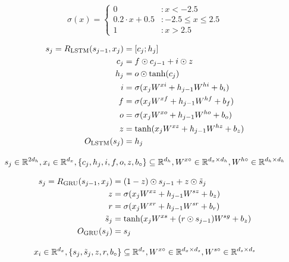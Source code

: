 \begin{equation} \label{eq:hardsigmoid}
  \sigma(x) = \begin{cases}
    0                 & : x < -2.5 \\
    0.2 \cdot x + 0.5 & : -2.5 \leq x \leq 2.5 \\
    1                 & : x > 2.5
  \end{cases}
\end{equation}

\begin{gather} \label{eq:lstm}
  \begin{split}
  s_j = R_{\text{LSTM}}(s_{j-1}, x_j) &= [c_j;h_j] \\
                           c_j &= f \odot c_{j-1} + i \odot z \\
                           h_j &= o \odot \tanh(c_j) \\
                             i &= \sigma(x_j W^{xi} + h_{j-1} W^{hi} + b_i) \\
                             f &= \sigma(x_j W^{xf} + h_{j-1} W^{hf} + b_f) \\
                             o &= \sigma(x_j W^{xo} + h_{j-1} W^{ho} + b_o) \\
                             z &= \tanh(x_j W^{xz} + h_{j-1} W^{hz} + b_z) \\
          O_{\text{LSTM}}(s_j) &= h_j
  \end{split}
  \\[2ex]
  s_j\in \mathbb{R}^{2d_h}, x_i\in \mathbb{R}^{d_x},
  \left\{c_j, h_j, i, f, o, z, b_{\circ}\right\}\subseteq \mathbb{R}^{d_h},
  W^{x\circ}\in \mathbb{R}^{d_x\times d_h},
  W^{h\circ}\in \mathbb{R}^{d_h\times d_h} \notag
\end{gather}

\begin{gather} \label{eq:gru}
  \begin{split}
  s_j = R_{\text{GRU}}(s_{j-1}, x_j) &= (1 - z) \odot s_{j-1} + z \odot {\tilde s}_j \\
                            z &= \sigma(x_j W^{xz} + h_{j-1} W^{sz} + b_z) \\
                            r &= \sigma(x_j W^{xr} + h_{j-1} W^{sr} + b_r) \\
                 {\tilde s}_j &= \tanh(x_j W^{xs} + (r \odot s_{j-1}) W^{sg} + b_z) \\
          O_{\text{GRU}}(s_j) &= s_j
  \end{split}
  \\[2ex]
  x_i\in \mathbb{R}^{d_x},
  \left\{s_j, {\tilde s}_j, z, r, b_{\circ}\right\} \subseteq \mathbb{R}^{d_s},
  W^{x\circ}\in \mathbb{R}^{d_x\times d_s},
  W^{s\circ}\in \mathbb{R}^{d_s\times d_s} \notag
\end{gather}


